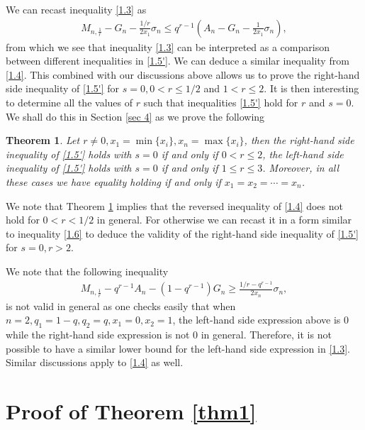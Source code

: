 \documentclass[11pt]{amsart}
\newtheorem{theorem}{Theorem}[section]
\numberwithin{equation}{section}
\theoremstyle{definition}
\theoremstyle{remark}
\begin{document}
    We can recast inequality \eqref{1.3} as
\begin{align}
\label{1.6}
    M_{n,\frac {1}{r}}-G_n-\frac
   {1/r}{2x_1}\sigma_n \leq q^{r-1} (A_n -G_n -\frac 1{2x_1}\sigma_n),
\end{align}
    from which we see that inequality \eqref{1.3} can be interpreted as a comparison between different inequalities in \eqref{1.5'}. We can deduce a similar inequality from \eqref{1.4}. This combined with our discussions above allows us to prove the right-hand side inequality of \eqref{1.5'} for $s=0, 0< r \leq 1/2$ and $1<r\leq 2$.  It is then interesting to determine all the values of $r$ such that inequalities \eqref{1.5'} hold for $r$ and $s=0$. We shall do this in Section \ref{sec 4} as we prove the following
\begin{theorem}
\label{thm2}
  Let $r \neq 0, x_1=\min \{ x_i \}, x_n=\max \{ x_i \}$, then the right-hand side inequality of \eqref{1.5'} holds with $s=0$ if and only if $0< r \leq 2$, the left-hand side inequality of \eqref{1.5'} holds with $s=0$ if and only if $1 \leq r \leq 3$. Moreover, in all these cases we have equality holding if and only if $x_1=x_2=\cdots=x_n$.
\end{theorem}

     We note that Theorem \ref{thm2} implies that the reversed inequality of \eqref{1.4} does not hold for $0<r<1/2$ in general. For otherwise we can recast it in a form similar to inequality \eqref{1.6} to deduce the validity of the right-hand side inequality of \eqref{1.5'} for $s=0, r>2$.

     We note that the following inequality
\begin{align*}
    M_{n,\frac {1}{r}}-q^{r-1} A_n -(1-q^{r-1}) G_n \geq \frac
   {1/r-q^{r-1}}{2x_n}\sigma_n,
\end{align*}
     is not valid in general as one checks easily that when $n=2, q_1=1-q, q_2=q, x_1=0, x_2=1$, the left-hand side expression above is $0$ while the right-hand side expression is not $0$ in general. Therefore, it is not possible to have a similar lower bound for the left-hand side expression in \eqref{1.3}. Similar discussions apply to \eqref{1.4} as well.

\section{Proof of Theorem \ref{thm1}}
\label{sec 3} \setcounter{equation}{0}
\end{document}
